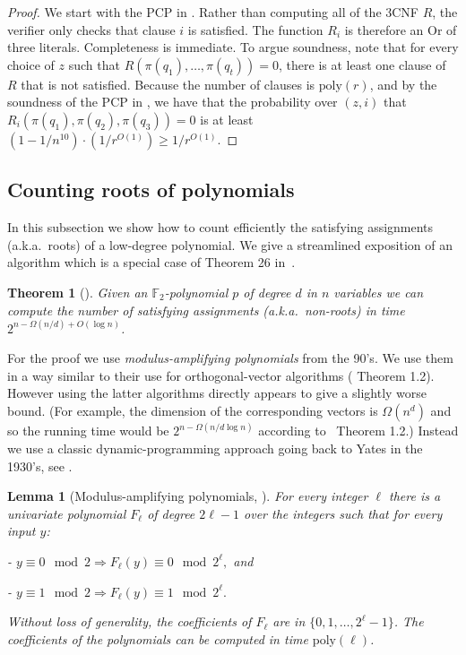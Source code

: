 \documentclass{toc}
\newtheorem{thm}[theorem]{Theorem}
\newtheorem{lem}[theorem]{Lemma}  %
\newcommand{\F}{\mathbb{F}}
\newcommand{\poly}{\mathrm{poly}}
\begin{document}
\begin{proof}
We start with the PCP in . Rather than computing
all of the 3CNF $R$, the verifier only checks that clause $i$ is
satisfied. The function $R_{i}$ is therefore an Or of three literals.
Completeness is immediate. To argue soundness, note that for every
choice of $z$ such that $R(\pi(q_{1}),\ldots,\pi(q_{t}))=0$, there
is at least one clause of $R$ that is not satisfied. Because the
number of clauses is $\poly(r)$, and by the soundness of the PCP
in , we have that the probability over $(z,i)$
that $R_{i}(\pi(q_{1}),\pi(q_{2}),\pi(q_{3}))=0$ is at least $(1-1/n^{10})\cdot(1/r^{O(1)})\ge1/r^{O(1)}$.
\end{proof}

\subsection{Counting roots of polynomials\label{subsec:=000023SAT-poly}}

In this subsection we show how to count efficiently the satisfying
assignments (a.k.a.~roots) of a low-degree polynomial. We give a
streamlined exposition of an algorithm which is a special case of
Theorem 26 in~\cite{DBLP:conf/coco/Williams18}.
\begin{thm}[{\cite[Theorem 26]{DBLP:conf/coco/Williams18}}]
\label{thm:=000023SAT-poly}
Given an $\F_{2}$-polynomial $p$ of degree $d$ in $n$ variables
we can compute the number of satisfying assignments (a.k.a.~non-roots)
in time $2^{n-\Omega(n/d)+O(\log n)}$.
\end{thm}

For the proof we use \emph{modulus-amplifying polynomials} from the
90's. We use them in a way similar to their use for orthogonal-vector
algorithms (\cite{DBLP:conf/soda/ChanW16} Theorem 1.2). However using
the latter algorithms directly appears to give a slightly worse bound.
(For example, the dimension of the corresponding vectors is $\Omega(n^{d})$
and so the running time would be $2^{n-\Omega(n/d\log n)}$ according
to~\cite{DBLP:conf/soda/ChanW16} Theorem 1.2.) Instead we use a classic
dynamic-programming approach going back to Yates in the %
1930's,  %
see \cite{Williams14-acc-jacm}.
\begin{lem}[{Modulus-amplifying polynomials, \cite{Yao90,BeT94}}] \label{lem:=00005BModulus-amplifying-polynomials=00005D}
For every integer $\ell$ there is a univariate polynomial $F_{\ell}$
of degree $2\ell-1$ over the integers such that for every input $y$:

- $y\equiv0\mod2\Rightarrow F_{\ell}(y)\equiv0\mod2^{\ell},$ and

- $y\equiv1\mod2\Rightarrow F_{\ell}(y)\equiv1\mod2^{\ell}.$

Without loss of generality, the coefficients of $F_{\ell}$ are in
$\{0,1,\ldots,2^{\ell}-1\}$. The coefficients of the polynomials
can be computed in time $\poly(\ell)$.
\end{lem}
\end{document}
